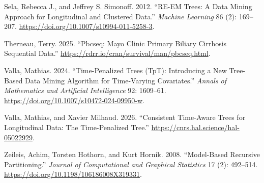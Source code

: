 \documentclass[
]{article}
\newlength{\cslhangindent}
\newenvironment{CSLReferences}[2] %
 {\begin{list}{}{%
  \setlength{\itemindent}{0pt}
  \setlength{\leftmargin}{0pt}
  \setlength{\parsep}{0pt}
  \ifodd #1
   \setlength{\leftmargin}{\cslhangindent}
   \setlength{\itemindent}{-1\cslhangindent}
  \fi
  \setlength{\itemsep}{#2\baselineskip}}}
 {\end{list}}
\begin{document}
\begin{CSLReferences}{1}{0}
Sela, Rebecca J., and Jeffrey S. Simonoff. 2012. {``{RE-EM} Trees: A
Data Mining Approach for Longitudinal and Clustered Data.''}
\emph{Machine Learning} 86 (2): 169--207.
\url{https://doi.org/10.1007/s10994-011-5258-3}.

Therneau, Terry. 2025. {``Pbcseq: Mayo Clinic Primary Biliary Cirrhosis
Sequential Data.''} \url{https://rdrr.io/cran/survival/man/pbcseq.html}.

Valla, Mathias. 2024. {``Time-Penalized Trees ({TpT}): Introducing a New
Tree-Based Data Mining Algorithm for Time-Varying Covariates.''}
\emph{Annals of Mathematics and Artificial Intelligence} 92: 1609--61.
\url{https://doi.org/10.1007/s10472-024-09950-w}.

Valla, Mathias, and Xavier Milhaud. 2026. {``Consistent Time-Aware Trees
for Longitudinal Data: The Time-Penalized Tree.''}
\url{https://cnrs.hal.science/hal-05022929}.

Zeileis, Achim, Torsten Hothorn, and Kurt Hornik. 2008. {``Model-Based
Recursive Partitioning.''} \emph{Journal of Computational and Graphical
Statistics} 17 (2): 492--514.
\url{https://doi.org/10.1198/106186008X319331}.

\end{CSLReferences}
\end{document}
